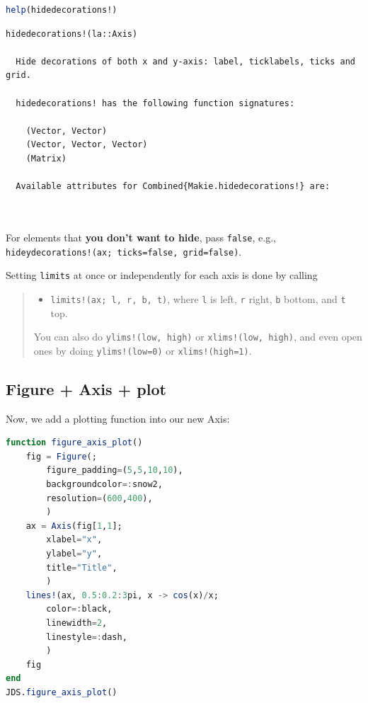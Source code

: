 \documentclass[
  notoc %
]{tufte-book}
\providecommand{\tightlist}{%
  \setlength{\itemsep}{0pt}\setlength{\parskip}{0pt}
}
\newcommand{\passthrough}[1]{#1}
\begin{document}
\begin{lstlisting}[language=Julia]
help(hidedecorations!)
\end{lstlisting}

\begin{lstlisting}[language=Output]
  hidedecorations!(la::Axis)

  Hide decorations of both x and y-axis: label, ticklabels, ticks and grid.

  hidedecorations! has the following function signatures:

    (Vector, Vector)
    (Vector, Vector, Vector)
    (Matrix)

  Available attributes for Combined{Makie.hidedecorations!} are:

  
\end{lstlisting}

For elements that \textbf{you don't want to hide}, pass
\passthrough{\lstinline!false!}, e.g.,
\passthrough{\lstinline"hideydecorations!(ax; ticks=false, grid=false)"}.

Setting \passthrough{\lstinline!limits!} at once or independently for
each axis is done by calling

\begin{quote}
\begin{itemize}
\tightlist
\item
  \passthrough{\lstinline"limits!(ax; l, r, b, t)"}, where
  \passthrough{\lstinline!l!} is left, \passthrough{\lstinline!r!}
  right, \passthrough{\lstinline!b!} bottom, and
  \passthrough{\lstinline!t!} top.
\end{itemize}

You can also do \passthrough{\lstinline"ylims!(low, high)"} or
\passthrough{\lstinline"xlims!(low, high)"}, and even open ones by doing
\passthrough{\lstinline"ylims!(low=0)"} or
\passthrough{\lstinline"xlims!(high=1)"}.
\end{quote}

\hypertarget{figure-axis-plot}{%
\subsection{Figure + Axis + plot}\label{figure-axis-plot}}

Now, we add a plotting function into our new Axis:

\begin{lstlisting}[language=Julia]
function figure_axis_plot()
    fig = Figure(;
        figure_padding=(5,5,10,10),
        backgroundcolor=:snow2,
        resolution=(600,400),
        )
    ax = Axis(fig[1,1];
        xlabel="x",
        ylabel="y",
        title="Title",
        )
    lines!(ax, 0.5:0.2:3pi, x -> cos(x)/x;
        color=:black,
        linewidth=2,
        linestyle=:dash,
        )
    fig
end
JDS.figure_axis_plot()
\end{lstlisting}
\end{document}
